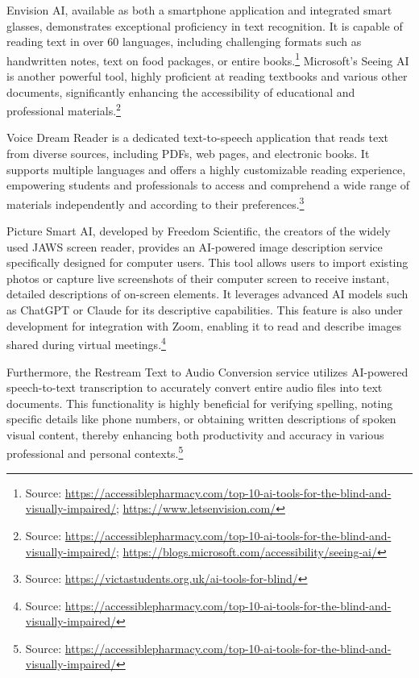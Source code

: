 Envision AI, available as both a smartphone application and integrated smart glasses, demonstrates exceptional proficiency in text recognition. It is capable of reading text in over 60 languages, including challenging formats such as handwritten notes, text on food packages, or entire books.\footnote{Source: \url{https://accessiblepharmacy.com/top-10-ai-tools-for-the-blind-and-visually-impaired/}; \url{https://www.letsenvision.com/}} Microsoft's Seeing AI is another powerful tool, highly proficient at reading textbooks and various other documents, significantly enhancing the accessibility of educational and professional materials.\footnote{Source: \url{https://accessiblepharmacy.com/top-10-ai-tools-for-the-blind-and-visually-impaired/}; \url{https://blogs.microsoft.com/accessibility/seeing-ai/}}

Voice Dream Reader is a dedicated text-to-speech application that reads text from diverse sources, including PDFs, web pages, and electronic books. It supports multiple languages and offers a highly customizable reading experience, empowering students and professionals to access and comprehend a wide range of materials independently and according to their preferences.\footnote{Source: \url{https://victastudents.org.uk/ai-tools-for-blind/}}

Picture Smart AI, developed by Freedom Scientific, the creators of the widely used JAWS screen reader, provides an AI-powered image description service specifically designed for computer users. This tool allows users to import existing photos or capture live screenshots of their computer screen to receive instant, detailed descriptions of on-screen elements. It leverages advanced AI models such as ChatGPT or Claude for its descriptive capabilities. This feature is also under development for integration with Zoom, enabling it to read and describe images shared during virtual meetings.\footnote{Source: \url{https://accessiblepharmacy.com/top-10-ai-tools-for-the-blind-and-visually-impaired/}}

Furthermore, the Restream Text to Audio Conversion service utilizes AI-powered speech-to-text transcription to accurately convert entire audio files into text documents. This functionality is highly beneficial for verifying spelling, noting specific details like phone numbers, or obtaining written descriptions of spoken visual content, thereby enhancing both productivity and accuracy in various professional and personal contexts.\footnote{Source: \url{https://accessiblepharmacy.com/top-10-ai-tools-for-the-blind-and-visually-impaired/}}

